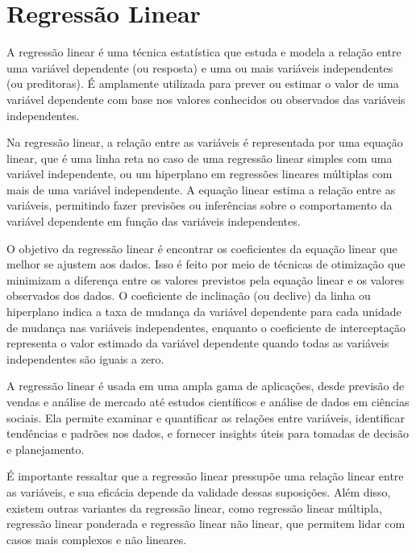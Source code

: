 \chapter{Regressão Linear}

A regressão linear é uma técnica estatística que estuda e modela a relação entre uma variável dependente (ou resposta) e uma ou mais variáveis independentes (ou preditoras). É amplamente utilizada para prever ou estimar o valor de uma variável dependente com base nos valores conhecidos ou observados das variáveis independentes.

Na regressão linear, a relação entre as variáveis é representada por uma equação linear, que é uma linha reta no caso de uma regressão linear simples com uma variável independente, ou um hiperplano em regressões lineares múltiplas com mais de uma variável independente. A equação linear estima a relação entre as variáveis, permitindo fazer previsões ou inferências sobre o comportamento da variável dependente em função das variáveis independentes.

O objetivo da regressão linear é encontrar os coeficientes da equação linear que melhor se ajustem aos dados. Isso é feito por meio de técnicas de otimização que minimizam a diferença entre os valores previstos pela equação linear e os valores observados dos dados. O coeficiente de inclinação (ou declive) da linha ou hiperplano indica a taxa de mudança da variável dependente para cada unidade de mudança nas variáveis independentes, enquanto o coeficiente de interceptação representa o valor estimado da variável dependente quando todas as variáveis independentes são iguais a zero.

A regressão linear é usada em uma ampla gama de aplicações, desde previsão de vendas e análise de mercado até estudos científicos e análise de dados em ciências sociais. Ela permite examinar e quantificar as relações entre variáveis, identificar tendências e padrões nos dados, e fornecer insights úteis para tomadas de decisão e planejamento.

É importante ressaltar que a regressão linear pressupõe uma relação linear entre as variáveis, e sua eficácia depende da validade dessas suposições. Além disso, existem outras variantes da regressão linear, como regressão linear múltipla, regressão linear ponderada e regressão linear não linear, que permitem lidar com casos mais complexos e não lineares.